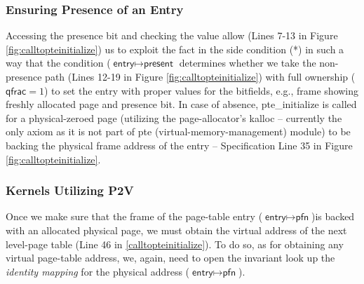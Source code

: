  \subsubsection{Ensuring Presence of an Entry}
 Accessing the presence bit and checking the value allow (Lines 7-13 in Figure \ref{fig:calltopteinitialize}) us to exploit the fact in the side condition (*) in such a way that the condition ($\textsf{entry}\mapsto\textsf{present}$ determines whether we take the non-presence path (Lines 12-19 in Figure \ref{fig:calltopteinitialize}) with full ownership ($\textsf{qfrac} = 1$) to set the entry with proper values for the bitfields, e.g., frame showing freshly allocated page and presence bit.
  In case of absence, \textsf{pte\_initialize} is called for a physical-zeroed page (utilizing the page-allocator's \textsf{kalloc} -- currently the only axiom as it is not part of \textsf{pte} (virtual-memory-management) module) to be backing the physical frame address of the entry -- Specification Line 35 in Figure \ref{fig:calltopteinitialize}.

  \subsubsection{Kernels Utilizing \textsf{P2V}}
  \label{sec:p2v}
 Once we make sure that the frame of the page-table entry ($\textsf{entry}\mapsto\textsf{pfn}$)is backed with an allocated physical page, we must obtain the virtual address of the next level-page table (Line 46 in \ref{calltopteinitialize}). To do so, as for obtaining any virtual page-table address, we, again, need to open the invariant look up the \textit{identity mapping} for the physical address ($\textsf{entry}\mapsto \textsf{pfn}$). 

